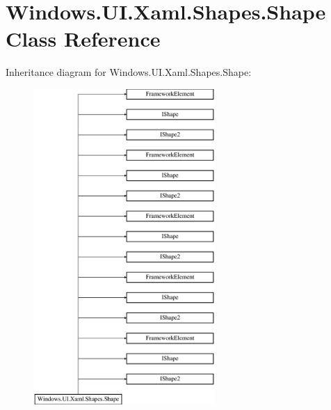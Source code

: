\hypertarget{class_windows_1_1_u_i_1_1_xaml_1_1_shapes_1_1_shape}{}\section{Windows.\+U\+I.\+Xaml.\+Shapes.\+Shape Class Reference}
\label{class_windows_1_1_u_i_1_1_xaml_1_1_shapes_1_1_shape}
Inheritance diagram for Windows.\+U\+I.\+Xaml.\+Shapes.\+Shape\+:\begin{figure}[H]
\begin{center}
\leavevmode
\includegraphics[height=12.000000cm]{class_windows_1_1_u_i_1_1_xaml_1_1_shapes_1_1_shape}
\end{center}
\end{figure}
